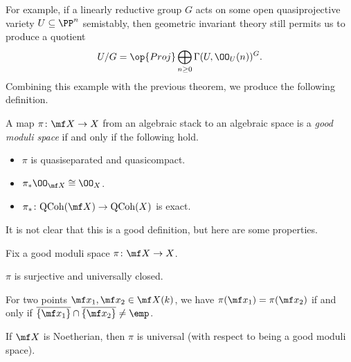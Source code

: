 \documentclass{article}
\begin{document}
For example, if a linearly reductive group $G$ acts on some open quasiprojective variety $U\subseteq\PP^n$ semistably, then geometric invariant theory still permits us to produce a quotient
\[U/G=\op{Proj}\bigoplus_{n\ge0}\Gamma(U,\OO_U(n))^G.\]
Combining this example with the previous theorem, we produce the following definition.
\begin{definition}
    A map $\pi\colon\mf X\to X$ from an algebraic stack to an algebraic space is a \textit{good moduli space} if and only if the following hold.
    \begin{itemize}
        \item $\pi$ is quasiseparated and quasicompact.
        \item $\pi_*\OO_{\mf X}\cong\OO_X$.
        \item $\pi_*\colon\mathrm{QCoh}(\mf X)\to\mathrm{QCoh}(X)$ is exact.
    \end{itemize}
\end{definition}
It is not clear that this is a good definition, but here are some properties.
\begin{theorem}
    Fix a good moduli space $\pi\colon\mf X\to X$.
    \begin{listalph}
        \item $\pi$ is surjective and universally closed.
        \item For two points $\mf x_1,\mf x_2\in\mf X(k)$, we have $\pi(\mf x_1)=\pi(\mf x_2)$ if and only if $\overline{\{\mf x_1\}}\cap\overline{\{\mf x_2\}}\ne\emp$.
        \item If $\mf X$ is Noetherian, then $\pi$ is universal (with respect to being a good moduli space).
    \end{listalph}
\end{theorem}
\end{document}
